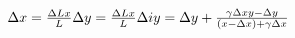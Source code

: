 \documentclass[10pt]{article}
\begin{document}
$\\
\Delta x = \frac{\Delta L x}{L} \\
\Delta y = \frac{\Delta L x}{L} \\
\Delta iy = \Delta y + \frac{\gamma\Delta x{y - \Delta y}}{(x - \Delta x) + \gamma \Delta x} 
$
\end{document}
